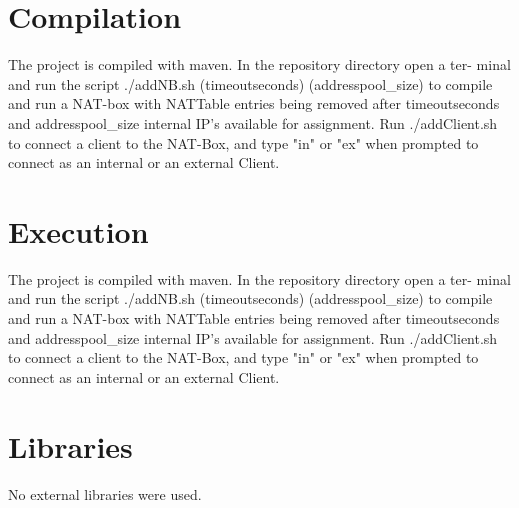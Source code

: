 \documentclass[12pt, a4paper]{article}
\begin{document}
\section{Compilation}
The project is compiled with maven. In the repository directory open a ter-
minal and run the script ./addNB.sh (timeoutseconds) (addresspool\_size) to compile and run a NAT-box with NATTable entries being removed after timeoutseconds and addresspool\_size internal IP's available for assignment. Run ./addClient.sh to connect a client to the NAT-Box, and type "in" or "ex" when prompted to connect as an internal or an external Client.

\section{Execution}
The project is compiled with maven. In the repository directory open a ter-
minal and run the script ./addNB.sh (timeoutseconds) (addresspool\_size) to compile and run a NAT-box with NATTable entries being removed after timeoutseconds and addresspool\_size internal IP's available for assignment. Run ./addClient.sh to connect a client to the NAT-Box, and type "in" or "ex" when prompted to connect as an internal or an external Client.

\section{Libraries}
No external libraries were used.
\end{document}
